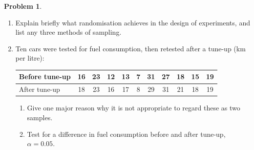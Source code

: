 \documentclass[11pt,a4paper]{article}
\theoremstyle{definition}
\newtheorem{problemx}{Problem}[section]
\newenvironment{problem}{\begin{problemx}}{\end{problemx}}
\begin{document}
\begin{problem}
\begin{enumerate}
\item[(a).] Explain briefly what randomisation achieves in the design of experiments, and list
any three methods of sampling.
\item[(b).] Ten cars were tested for fuel consumption, then retested after a tune-up
(km per litre):
\begin{table}[H]
\centering
\begin{tabular}{|l|c|c|c|c|c|c|c|c|c|c|}
\hline
Before tune-up & 16 & 23 & 12 & 13 & 7 & 31 & 27 & 18 & 15 & 19\\
\hline
After tune-up & 18 & 23 & 16 & 17 & 8 & 29 & 31 & 21 & 18 & 19\\
\hline
\end{tabular}
\end{table}
\begin{enumerate}
\item[(i).] Give one major reason why it is not appropriate to regard these as two samples.
\item[(ii).] Test for a difference in fuel consumption before and after tune-up, $\alpha=0.05$.
\end{enumerate}
\end{enumerate}
\end{problem}
\end{document}
